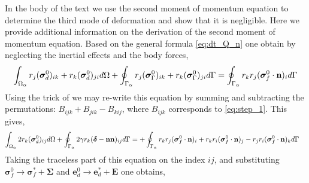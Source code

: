 In the body of the text we use the second moment of momentum equation to determine the third mode of deformation and show that it is negligible. 
Here we provide additional information on the derivation of the second moment of momentum equation. 
Based on the general formula \ref{eq:dt_Q_n} one obtain by neglecting the inertial effects  and the body forces,  
\begin{equation}
    \intO{ r_{j}(\bm{\sigma}^0_d)_{ik}+r_{k}(\bm{\sigma}^0_d)_{ji}}
    +\intS{ r_{j}(\bm{\sigma}^0_\Gamma)_{ik}+r_{k}(\bm{\sigma}_\Gamma^0)_{ji}}
    = 
    \intS{  r_{k}r_{j} (\bm{\sigma}_f^0\cdot\textbf{n})_i }
    \label{eq:step_1}
\end{equation}
Using the trick of \citet{lhuillier1996contribution} we may re-write this equation by summing and subtracting the permutations:  $B_{ijk} + B_{jik} - B_{kij}$, where $B_{ijk}$ corresponds to \ref{eq:step_1}. 
This gives, 
\begin{align}
    \int_{\Omega_{\alpha}} 2 r_{k}(\bm{\sigma}^0_d)_{ij} d\Omega
    +\oint_{\Gamma_{\alpha}} 2\gamma r_{k}(\bm\delta - \textbf{nn})_{ij} d\Gamma
    &= 
    +\oint_{\Gamma_{\alpha}} 
        r_{k}r_{j} (\bm{\sigma}_f^0\cdot\textbf{n})_i 
        + r_{k}r_{i} (\bm{\sigma}_f^0\cdot\textbf{n})_j 
        - r_{j}r_{i} (\bm{\sigma}_f^0\cdot\textbf{n})_k 
     d\Gamma
\end{align}
Taking the traceless part of this equation on the index $ij$, and substituting $\bm\sigma_f^0 \to \bm\sigma_f^* + \bm\Sigma$ and $\textbf{e}_d^0 \to \textbf{e}_d^* + \textbf{E}$ one obtains, 
